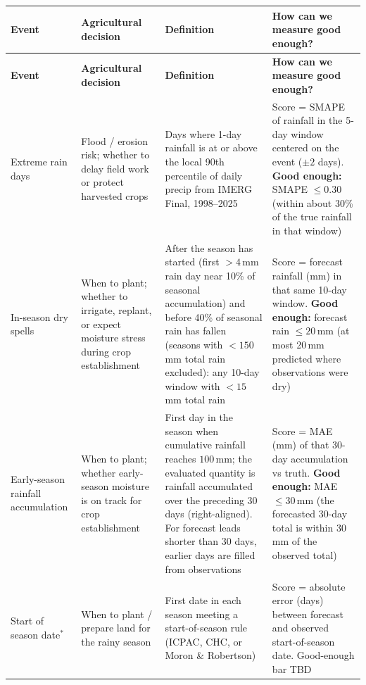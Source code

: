 \documentclass[11pt]{article}
\begin{document}
{\small
\begin{longtable}{@{}>{\raggedright\arraybackslash}p{}
                  >{\raggedright\arraybackslash}p{}
                  >{\raggedright\arraybackslash}p{}
                  >{\raggedright\arraybackslash}p{}@{}}
\toprule
\textbf{Event} & \textbf{Agricultural decision} & \textbf{Definition}
  & \textbf{How can we measure good enough?} \\
\midrule
\endfirsthead
\toprule
\textbf{Event} & \textbf{Agricultural decision} & \textbf{Definition}
  & \textbf{How can we measure good enough?} \\
\midrule
\endhead
Extreme rain days
  & Flood / erosion risk; whether to delay field work or protect harvested crops
  & Days where 1-day rainfall is at or above the local 90th percentile of
    daily precip from IMERG Final, 1998--2025
  & Score = SMAPE of rainfall in the 5-day window centered on the event
    (\(\pm 2\) days). \textbf{Good enough:} SMAPE \(\le 0.30\)
    (within about 30\% of the true rainfall in that window) \\
\addlinespace
In-season dry spells
  & When to plant; whether to irrigate, replant, or expect moisture stress during crop establishment
  & After the season has started (first \(>4\)\,mm rain day near 10\% of
    seasonal accumulation) and before 40\% of seasonal rain has fallen
    (seasons with \(<150\)\,mm total rain excluded): any 10-day window with
    \(<15\)\,mm total rain
  & Score = forecast rainfall (mm) in that same 10-day window.
    \textbf{Good enough:} forecast rain \(\le 20\)\,mm
    (at most 20\,mm predicted where observations were dry) \\
\addlinespace
Early-season rainfall accumulation
  & When to plant; whether early-season moisture is on track for crop establishment
  & First day in the season when cumulative rainfall reaches \(100\)\,mm;
    the evaluated quantity is rainfall accumulated over the preceding
    30 days (right-aligned). For forecast leads shorter than 30 days,
    earlier days are filled from observations
  & Score = MAE (mm) of that 30-day accumulation vs truth.
    \textbf{Good enough:} MAE \(\le 30\)\,mm
    (the forecasted 30-day total is within 30\,mm of the observed total) \\
\addlinespace
Start of season date\(^*\)
  & When to plant / prepare land for the rainy season
  & First date in each season meeting a start-of-season rule
    (ICPAC, CHC, or Moron \& Robertson)
  & Score = absolute error (days) between forecast and observed
    start-of-season date. Good-enough bar TBD \\
\bottomrule
\end{longtable}
}
\end{document}
